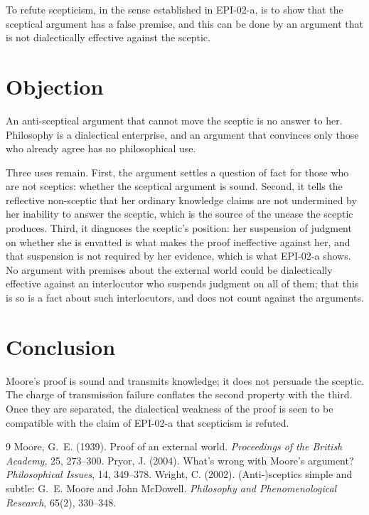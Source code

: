 \documentclass{situationist-preprint}
\begin{document}
\begin{corollary}\label{c:refute}
To refute scepticism, in the sense established in EPI-02-a, is to show that the sceptical argument has a false premise, and this can be done by an argument that is not dialectically effective against the sceptic.
\end{corollary}

\section{Objection}

\begin{objection}
An anti-sceptical argument that cannot move the sceptic is no answer to her. Philosophy is a dialectical enterprise, and an argument that convinces only those who already agree has no philosophical use.
\end{objection}

\begin{reply}
Three uses remain. First, the argument settles a question of fact for those who are not sceptics: whether the sceptical argument is sound. Second, it tells the reflective non-sceptic that her ordinary knowledge claims are not undermined by her inability to answer the sceptic, which is the source of the unease the sceptic produces. Third, it diagnoses the sceptic's position: her suspension of judgment on whether she is envatted is what makes the proof ineffective against her, and that suspension is not required by her evidence, which is what EPI-02-a shows. No argument with premises about the external world could be dialectically effective against an interlocutor who suspends judgment on all of them; that this is so is a fact about such interlocutors, and does not count against the arguments.
\end{reply}

\section{Conclusion}

Moore's proof is sound and transmits knowledge; it does not persuade the sceptic. The charge of transmission failure conflates the second property with the third. Once they are separated, the dialectical weakness of the proof is seen to be compatible with the claim of EPI-02-a that scepticism is refuted.

\begin{thebibliography}{9}\small
{} Moore, G.~E. (1939). Proof of an external world. \emph{Proceedings of the British Academy}, 25, 273--300.
 Pryor, J. (2004). What's wrong with Moore's argument? \emph{Philosophical Issues}, 14, 349--378.
 Wright, C. (2002). (Anti-)sceptics simple and subtle: G.~E. Moore and John McDowell. \emph{Philosophy and Phenomenological Research}, 65(2), 330--348.
\end{thebibliography}
\end{document}
